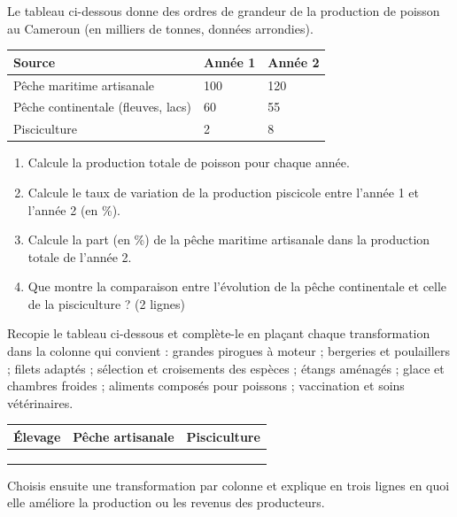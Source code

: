 \documentclass[11pt]{article}
\newcounter{popsec}
\newcounter{popsub}
\newcommand{\courssub}[1]{%
  \stepcounter{popsub}%
  \par\vspace{9pt}\noindent{\popxbold\fontsize{11.5}{13}\selectfont\color{popink}{\color{poporange}\thepopsec.\thepopsub}\hspace{6pt}#1}\par\nopagebreak\vspace{4pt}
}
\begin{document}
\begin{exercice}
Le tableau ci-dessous donne des ordres de grandeur de la production de poisson au Cameroun (en milliers de tonnes, données arrondies).

\begin{center}
\begin{tabularx}{\linewidth}{|l|X|X|}\hline
\rowcolor{popblueL} \textbf{Source} & \textbf{Année 1} & \textbf{Année 2} \\ \hline
Pêche maritime artisanale & 100 & 120 \\ \hline
Pêche continentale (fleuves, lacs) & 60 & 55 \\ \hline
Pisciculture & 2 & 8 \\ \hline
\end{tabularx}
\end{center}

\begin{enumerate}
\item Calcule la production totale de poisson pour chaque année.
\item Calcule le taux de variation de la production piscicole entre l'année 1 et l'année 2 (en \%).
\item Calcule la part (en \%) de la pêche maritime artisanale dans la production totale de l'année 2.
\item Que montre la comparaison entre l'évolution de la pêche continentale et celle de la pisciculture ? (2 lignes)
\end{enumerate}
\end{exercice}

\courssub{Je m'entraîne}

\begin{exercice}
Recopie le tableau ci-dessous et complète-le en plaçant chaque transformation dans la colonne qui convient : grandes pirogues à moteur ; bergeries et poulaillers ; filets adaptés ; sélection et croisements des espèces ; étangs aménagés ; glace et chambres froides ; aliments composés pour poissons ; vaccination et soins vétérinaires.

\begin{center}
\begin{tabularx}{\linewidth}{|X|X|X|}\hline
\rowcolor{popblueL} \textbf{Élevage} & \textbf{Pêche artisanale} & \textbf{Pisciculture} \\ \hline
 & & \\ \hline
 & & \\ \hline
 & & \\ \hline
\end{tabularx}
\end{center}

Choisis ensuite une transformation par colonne et explique en trois lignes en quoi elle améliore la production ou les revenus des producteurs.
\end{exercice}
\end{document}
